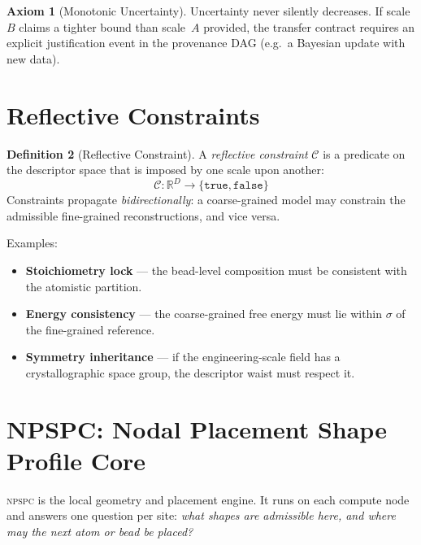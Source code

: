 \documentclass[11pt,a4paper]{article}
\theoremstyle{definition}
\newtheorem{definition}{Definition}[section]
\newtheorem{axiom}[definition]{Axiom}
\theoremstyle{plain}
\newcommand{\NPSPC}{\textsc{npspc}}
\newcommand{\constraint}{\mathcal{C}}
\newcommand{\unc}{\sigma}
\begin{document}
\begin{axiom}[Monotonic Uncertainty]
\label{ax:uncertainty}
Uncertainty never silently decreases.  If scale~$B$ claims a tighter
bound than scale~$A$ provided, the transfer contract requires an
explicit justification event in the provenance DAG (e.g.\ a Bayesian
update with new data).
\end{axiom}


\section{Reflective Constraints}
\label{sec:constraints}

\begin{definition}[Reflective Constraint]
\label{def:constraint}
A \emph{reflective constraint} $\constraint$ is a predicate on
the descriptor space that is imposed by one scale upon another:
\[
  \constraint : \mathbb{R}^{D} \to \{\texttt{true}, \texttt{false}\}
\]
Constraints propagate \emph{bidirectionally}: a coarse-grained model
may constrain the admissible fine-grained reconstructions, and vice
versa.
\end{definition}

\noindent
Examples:
\begin{itemize}[nosep]
  \item \textbf{Stoichiometry lock} ---
        the bead-level composition must be consistent with the
        atomistic partition.
  \item \textbf{Energy consistency} ---
        the coarse-grained free energy must lie within $\unc$ of
        the fine-grained reference.
  \item \textbf{Symmetry inheritance} ---
        if the engineering-scale field has a crystallographic space
        group, the descriptor waist must respect it.
\end{itemize}


\section{NPSPC: Nodal Placement Shape Profile Core}
\label{sec:npspc}

\NPSPC{} is the local geometry and placement engine.  It runs on
each compute node and answers one question per site: \emph{what
shapes are admissible here, and where may the next atom or bead
be placed?}
\end{document}
